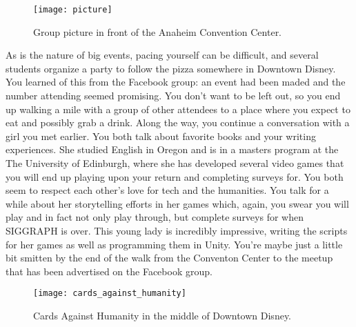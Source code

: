 \documentclass[../main.tex]{subfiles}
\begin{document}
\begin{figure}[h]
	\centering
	\texttt{[image: picture]}
	\caption*{Group picture in front of the Anaheim Convention Center.}
\end{figure}

As is the nature of big events, pacing yourself can be difficult, and several students organize a party to follow the pizza somewhere in Downtown Disney. You learned of this from the Facebook group: an event had been maded and the number attending seemed promising. You don't want to be left out, so you end up walking a mile with a group of other attendees to a place where you expect to eat and possibly grab a drink. Along the way, you continue a conversation with a girl you met earlier. You both talk about favorite books and your writing experiences. She studied English in Oregon and is in a masters program at the The University of Edinburgh, where she has developed several video games that you will end up playing upon your return and completing surveys for. You both seem to respect each other's love for tech and the humanities. You talk for a while about her storytelling efforts in her games which, again, you swear you will play and in fact not only play through, but complete surveys for when SIGGRAPH is over. This young lady is incredibly impressive, writing the scripts for her games as well as programming them in Unity. You're maybe just a little bit smitten by the end of the walk from the Conventon Center to the meetup that has been advertised on the Facebook group.

\begin{figure}[h]
	\centering
	\texttt{[image: cards\_against\_humanity]}
	\caption*{Cards Against Humanity in the middle of Downtown Disney.}
\end{figure}
\end{document}
